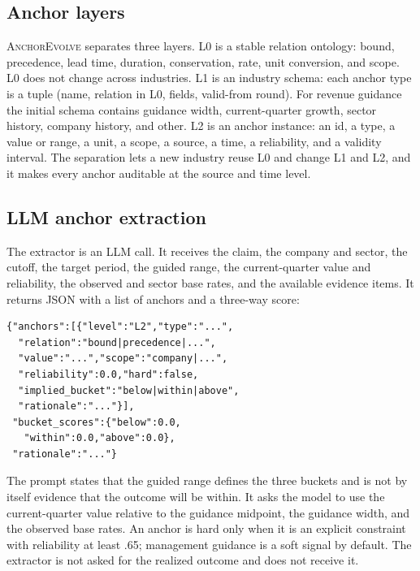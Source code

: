 \documentclass[11pt]{article}
\newcommand{\anchor}{\textsc{AnchorEvolve}}
\begin{document}
\subsection{Anchor layers}
\anchor{} separates three layers. L0 is a stable relation ontology: bound, precedence, lead time, duration, conservation, rate, unit conversion, and scope. L0 does not change across industries. L1 is an industry schema: each anchor type is a tuple (name, relation in L0, fields, valid-from round). For revenue guidance the initial schema contains guidance width, current-quarter growth, sector history, company history, and other. L2 is an anchor instance: an id, a type, a value or range, a unit, a scope, a source, a time, a reliability, and a validity interval. The separation lets a new industry reuse L0 and change L1 and L2, and it makes every anchor auditable at the source and time level.

\subsection{LLM anchor extraction}
The extractor is an LLM call. It receives the claim, the company and sector, the cutoff, the target period, the guided range, the current-quarter value and reliability, the observed and sector base rates, and the available evidence items. It returns JSON with a list of anchors and a three-way score:
{\scriptsize
\begin{verbatim}
{"anchors":[{"level":"L2","type":"...",
  "relation":"bound|precedence|...",
  "value":"...","scope":"company|...",
  "reliability":0.0,"hard":false,
  "implied_bucket":"below|within|above",
  "rationale":"..."}],
 "bucket_scores":{"below":0.0,
   "within":0.0,"above":0.0},
 "rationale":"..."}
\end{verbatim}}
The prompt states that the guided range defines the three buckets and is not by itself evidence that the outcome will be within. It asks the model to use the current-quarter value relative to the guidance midpoint, the guidance width, and the observed base rates. An anchor is hard only when it is an explicit constraint with reliability at least .65; management guidance is a soft signal by default. The extractor is not asked for the realized outcome and does not receive it.
\end{document}
